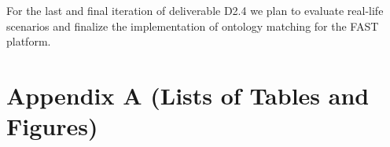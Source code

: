 \documentclass{fast_latex}
\begin{document}
For the last and final iteration of deliverable D2.4 we plan to evaluate real-life scenarios and finalize the implementation of ontology matching for the FAST platform.

\clearpage



\clearpage
\doublespacing
\appendix
\section*{Appendix A (Lists of Tables and Figures)}

\listoftables

\listoffigures
\end{document}
